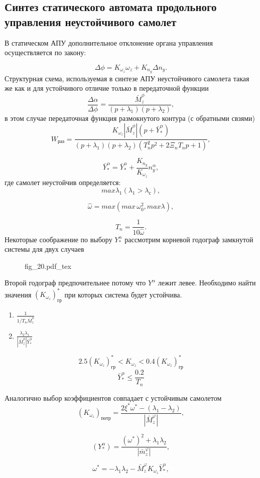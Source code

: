 \documentclass{article}
\begin{document}
\subsection{Синтез статического автомата продольного управления неустойчивого самолет}
В статическом АПУ дополнительное отклонение органа управления осуществляется по закону: 

\[
\Delta \phi = K_{\omega_{z}} \omega_z + K_{n_y} \Delta n_y.
\]
Структурная схема, используемая в синтезе АПУ неустойчивого самолета такая же как и для устойчивого отличие только в передаточной функции 
\[
{\frac{\Delta \alpha}{\Delta \phi} } = \frac{\bar{M}_z^\phi}{(p+\lambda_1)(p+\lambda_2)},
\]
в этом случае передаточная функция размокнутого контура (с обратными свзями)
\[
W_{раз} = \frac{K_{\omega_z} |\bar{M}_z^\phi |(p + \bar{Y}^\alpha_*) }{(p+\lambda_1)(p+\lambda_2)(T_n^2 p^2 + 2 \Xi_n T_n p +1)},
\]

\[
\bar{Y}_*^\alpha = \bar{Y}_*^\alpha + \frac{K_{n_y}}{K_{\omega_z}} n_y^\alpha,
\]
где самолет неустойчив определяется: 
\[
max \lambda_1 (\lambda_1 > \lambda_с),
\]

\[
\hat{\omega} = max(max \, \omega_0^2, max \lambda),
\]

\[
T_n = \frac{1}{10 \hat{\omega}}.
\]
Некоторые соображение по выбору $Y_*^\alpha$ рассмотрим корневой годограф замкнутой системы для двух случаев 
\begin{figure}[ht]
\centering
{fig_20.pdf_tex}
\end{figure}

Второй годограф предпочительнее потому что $Y^\alpha$ лежит левее.
Необходимо найти значения $(K_{\omega_z})_{гр}^*$ при которых система будет устойчива.
\begin{enumerate}
\item $\frac{1}{1/T_n \bar{M}_z^\phi}$
\item $\frac{\lambda_2 \lambda_1}{| \bar{M}_z^\phi|\bar{Y}_*^\alpha}$
\end{enumerate}
\[
2.5 (K_{\omega_z})^*_{гр} < K_{\omega_z} < 0.4(K_{\omega_z})^*_{гр}  
\]
\[
\bar{Y}_*^\alpha \le \frac{0.2}{T_n}
\]

Аналогично выбор коэффициентов совпадает с устойчивым самолетом 
\[
(K_{\omega_z})_{потр} = \frac{2 \xi^* \omega^* - (\lambda_1 - \lambda_2)}{|\bar{M}_z^\varphi|},
\]

\[
(Y_*^\alpha) = \frac{(\omega^*)^2 + \lambda_1 \lambda_2}{|\bar{m}_z^\varphi|},
\]

\[
\omega^* =  - \lambda_1 \lambda_2 - \bar{M}_z^\varphi K_{\omega_z} \bar{Y}_*^\alpha, 
\]
\end{document}
